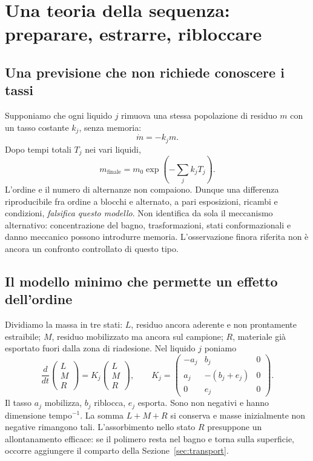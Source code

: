 \documentclass[11pt,reqno]{amsart}
\numberwithin{equation}{section}
\begin{document}
\section{Una teoria della sequenza: preparare, estrarre, ribloccare}
\label{sec:states}

\subsection{Una previsione che non richiede conoscere i tassi}
Supponiamo che ogni liquido $j$ rimuova una stessa popolazione di
residuo $m$ con un tasso costante $k_j$, senza memoria:
\begin{equation}\label{eq:scalar}
 \dot m=-k_jm.
\end{equation}
Dopo tempi totali $T_j$ nei vari liquidi,
\begin{equation}\label{eq:orderindependent}
 m_{\mathrm{finale}}=m_0\exp\!\left(-\sum_j k_jT_j\right).
\end{equation}
L'ordine e il numero di alternanze non compaiono. Dunque una
differenza riproducibile fra ordine a blocchi e alternato, a pari
esposizioni, ricambi e condizioni, \emph{falsifica questo modello}.
Non identifica da sola il meccanismo alternativo: concentrazione
del bagno, trasformazioni, stati conformazionali e danno meccanico
possono introdurre memoria. L'osservazione finora riferita non \`e
ancora un confronto controllato di questo tipo.

\subsection{Il modello minimo che permette un effetto dell'ordine}
Dividiamo la massa in tre stati:
$L$, residuo ancora aderente e non prontamente estraibile;
$M$, residuo mobilizzato ma ancora sul campione;
$R$, materiale gi\`a esportato fuori dalla zona di riadesione.
Nel liquido $j$ poniamo
\begin{equation}\label{eq:generator}
 \frac{d}{dt}
 \begin{pmatrix}L\\M\\R\end{pmatrix}
 =K_j\begin{pmatrix}L\\M\\R\end{pmatrix},\qquad
 K_j=\begin{pmatrix}
 -a_j&b_j&0\\a_j&-(b_j+e_j)&0\\0&e_j&0
 \end{pmatrix}.
\end{equation}
Il tasso $a_j$ mobilizza, $b_j$ riblocca, $e_j$ esporta.
Sono non negativi e hanno dimensione tempo$^{-1}$.
La somma $L+M+R$ si conserva e masse inizialmente non negative
rimangono tali. L'assorbimento nello stato $R$ presuppone un
allontanamento efficace: se il polimero resta nel bagno e torna
sulla superficie, occorre aggiungere il comparto della
Sezione~\ref{sec:transport}.
\end{document}
